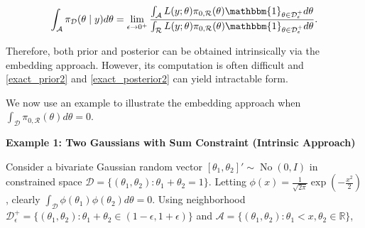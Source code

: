 \documentclass[10pt]{article}
\newcommand{\mc}[1]{\mathcal{#1}}
\DeclareMathOperator{\No}{No}
\DeclareMathOperator{\1}{\mathbbm{1}}
\begin{document}
\begin{equation}
\label{exact_posterior2}
	\int_{\mc A} {\pi}_{\mc D}(\theta \mid y) d\theta = \lim_{\epsilon\rightarrow 0^+}  \frac{ \int_{\mc A}  L(y;\theta)\pi_{0,\mc R}(\theta)\mathbbm{1}_{\theta\in \mc D_\epsilon^+}  d\theta }{ \int_{\mc R} L(y;\theta)\pi_{0,\mc R}(\theta) \mathbbm{1}_{\theta\in \mc D_\epsilon^+}d\theta }.
\end{equation}

Therefore, both prior and posterior can be obtained intrinsically via the embedding approach. However, its computation is often difficult and \eqref{exact_prior2} and \eqref{exact_posterior2} can yield intractable form. 

We now use an example to illustrate the embedding approach when $\int_{\mc D} \pi_{0,\mc R}(\theta)d\theta =0$.

{\bf Example 1: Two Gaussians with Sum Constraint (Intrinsic Approach)}

Consider a bivariate Gaussian random vector $[\theta_1,\theta_2]' \sim \No(0,I)$ in constrained space $\mc D=\{(\theta_1,\theta_2):\theta_1+\theta_2=1\}$. Letting $\phi(x)= \frac{1}{\sqrt{2\pi}} \exp(-\frac{x^2}{2})$, clearly $\int_{\mc D} \phi(\theta_1)\phi(\theta_2)d\theta =0$. Using neighborhood $\mc D^+_\epsilon=\{(\theta_1,\theta_2):\theta_1+\theta_2 \in (1-\epsilon, 1+\epsilon)\}$ and $\mc A= \{(\theta_1,\theta_2): \theta_1< x, \theta_2\in \mathbb R\}$,
\end{document}
